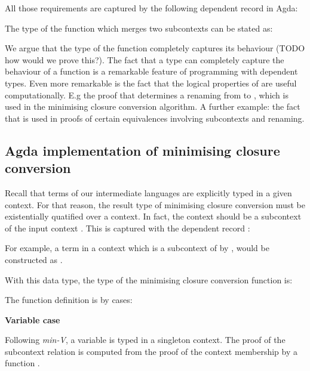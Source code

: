 \documentclass[bsc,frontabs,oneside,singlespacing,parskip,deptreport]{infthesis}
\theoremstyle{definition}
\theoremstyle{lemma}
\begin{document}
All those requirements are captured by the following dependent record
in Agda:


The type of the function which merges two subcontexts can be stated
as:


We argue that the type of the function completely captures its
behaviour (TODO how would we prove this?). The fact that a type can
completely capture the behaviour of a function is a remarkable feature
of programming with dependent types. Even more remarkable is the fact
that the logical properties of  are useful computationally. E.g
the proof that  determines a renaming from  to
, which is used in the minimising closure conversion
algorithm. A further example: the fact that  is used in proofs of certain equivalences involving subcontexts
and renaming.

\subsection{Agda implementation of minimising closure conversion}
\label{sec:agda-impl-minim}

Recall that terms of our intermediate languages are explicitly typed
in a given context. For that reason, the result type of minimising
closure conversion must be existentially quatified over a
context. In fact, the context should be a subcontext of the input
context . This is captured with the dependent record
:


For example, a term  in a context  which is a subcontext
of  by , would be constructed as .

With this data type, the type of the minimising closure conversion
function is:


The function definition is by cases:

\textbf{Variable case}


Following \textit{min-V}, a variable is typed in a singleton
context. The proof of the subcontext relation is computed from the
proof of the context membership by a function .
\end{document}
